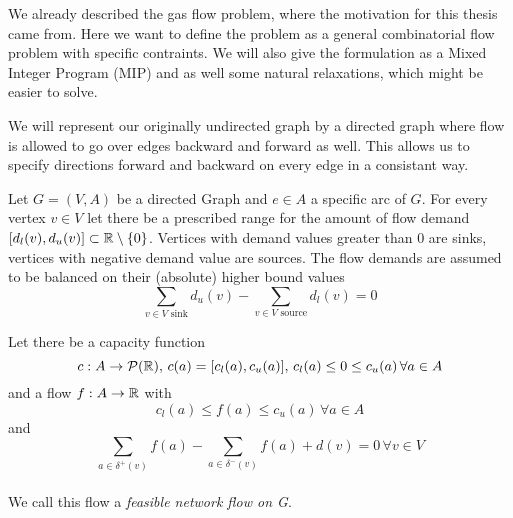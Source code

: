 We already described the gas flow problem, where the motivation for this thesis came from. Here we want to define the 
problem as a general combinatorial flow problem with specific contraints. We will also give the formulation as a Mixed 
Integer Program (MIP) and as well some natural relaxations, which might be easier to solve.

We will represent our originally undirected graph by a directed graph where flow is allowed to go over edges backward 
and forward as well. This allows us to specify directions forward and backward on every edge in a consistant way. 


\begin{definition}
 Let $G=(V,A)$ be a directed Graph and $e \in A$ a specific arc of $G$. For every vertex $v\in V$ let there be a 
prescribed range for the amount of flow demand $[d_l(v), d_u(v)]\subset \mathbb{R} \setminus \{0\}$. Vertices with demand 
values greater than 0 are sinks, vertices with negative demand value are sources. The flow demands are assumed to be 
balanced on their (absolute) higher bound values 
$$\sum_{v \in V\textrm{ sink}}d_u(v)-\sum_{v \in V\textrm{ source}}d_l(v)=0$$ 

Let there be a capacity function 
$$c:A\to \mathcal{P}(\mathbb{R}), \, c(a)=[c_l(a), c_u(a)],\, c_l(a)\le 0 \le c_u(a) \, \forall a\in A$$
and a flow  $f: A\to \mathbb{R} $ with $$c_l(a)\le f(a)\le 
c_u(a)\, \forall a\in A$$ and $$\sum_{a\in \delta^+(v)}f(a)-\sum_{a\in\delta^-(v)}f(a)+d(v) = 0 \, \forall v\in V$$\\
We call this flow a \textit{feasible network flow on G}.
\end{definition}

